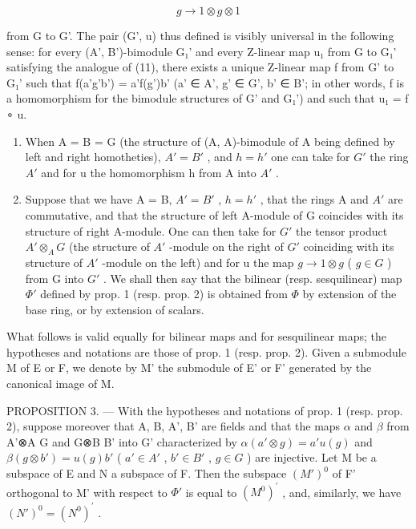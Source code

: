 \[
g \to 1 \otimes g \otimes 1\tag{\(g\in G\)}
\]

from G to G'. The pair (G', u) thus defined is visibly universal in the following sense: for every (A', B')-bimodule G₁' and every Z-linear map u₁ from G to G₁' satisfying the analogue of (11), there exists a unique Z-linear map f from G' to G₁' such that f(a'g'b') = a'f(g')b' (a' ∈ A', g' ∈ G', b' ∈ B'; in other words, f is a homomorphism for the bimodule structures of G' and G₁') and such that u₁ = f ∘ u.

\begin{enumerate}
\def\labelenumi{\arabic{enumi})}
\setcounter{enumi}{1}
\item
  When A = B = G (the structure of (A, A)-bimodule of A being defined by left and right homotheties), \(A' = B'\) , and \(h = h'\) one can take for \(G'\) the ring \(A'\) and for u the homomorphism h from A into \(A'\) .
\item
  Suppose that we have A = B, \(A' = B'\) , \(h = h'\) , that the rings A and \(A'\) are commutative, and that the structure of left A-module of G coincides with its structure of right A-module. One can then take for \(G'\) the tensor product \(A' \otimes_{A} G\) (the structure of \(A'\) -module on the right of \(G'\) coinciding with its structure of \(A'\) -module on the left) and for u the map \(g \to 1 \otimes g\) ( \(g \in G\) ) from G into \(G'\) . We shall then say that the bilinear (resp. sesquilinear) map \(\Phi'\) defined by prop. 1 (resp. prop. 2) is obtained from \(\Phi\) by extension of the base ring, or by extension of scalars.
\end{enumerate}

What follows is valid equally for bilinear maps and for sesquilinear maps; the hypotheses and notations are those of prop. 1 (resp. prop. 2). Given a submodule M of E or F, we denote by M' the submodule of E' or F' generated by the canonical image of M.

PROPOSITION 3. --- With the hypotheses and notations of prop. 1 (resp. prop. 2), suppose moreover that A, B, A', B' are fields and that the maps \(\alpha\) and \(\beta\) from A'⊗A G and G⊗B B' into G' characterized by \(\alpha(a'\otimes g)=a'u(g)\) and \(\beta(g\otimes b')=u(g)b'\) ( \(a'\in A'\) , \(b'\in B'\) , \(g\in G\) ) are injective. Let M be a subspace of E and N a subspace of F. Then the subspace \((M')^{0}\) of F' orthogonal to M' with respect to \(\Phi'\) is equal to \((M^{0})^{\prime}\) , and, similarly, we have \((N')^{0} = (N^{0})^{\prime}\) .


